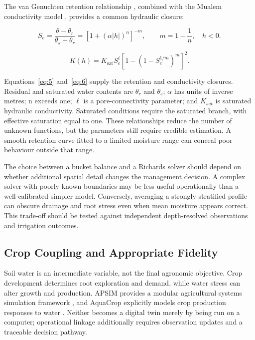 \documentclass[acmsmall,screen,nonacm]{acmart}
\begin{document}
The van Genuchten retention relationship \cite{R08}, combined with the Mualem conductivity model \cite{R09}, provides a common hydraulic closure:

\begin{equation}
S_e=\frac{\theta-\theta_r}{\theta_s-\theta_r}=\left[1+(\alpha|h|)^n\right]^{-m},\qquad m=1-\frac{1}{n},\quad h<0.
\label{eq:5}
\end{equation}

\begin{equation}
K(h)=K_{\mathrm{sat}}S_e^{\ell}\left[1-\left(1-S_e^{1/m}\right)^m\right]^2.
\label{eq:6}
\end{equation}

Equations~\eqref{eq:5} and~\eqref{eq:6} supply the retention and conductivity closures. Residual and saturated water contents are $\theta_{r}$ and $\theta_{s}$; $\alpha$ has units of inverse metres; n exceeds one; $\ell$ is a pore-connectivity parameter; and $K_{sat}$ is saturated hydraulic conductivity. Saturated conditions require the saturated branch, with effective saturation equal to one. These relationships reduce the number of unknown functions, but the parameters still require credible estimation. A smooth retention curve fitted to a limited moisture range can conceal poor behaviour outside that range.

The choice between a bucket balance and a Richards solver should depend on whether additional spatial detail changes the management decision. A complex solver with poorly known boundaries may be less useful operationally than a well-calibrated simpler model. Conversely, averaging a strongly stratified profile can obscure drainage and root stress even when mean moisture appears correct. This trade-off should be tested against independent depth-resolved observations and irrigation outcomes.

\subsection{Crop Coupling and Appropriate Fidelity}

\label{sec:4-3}

Soil water is an intermediate variable, not the final agronomic objective. Crop development determines root exploration and demand, while water stress can alter growth and production. APSIM provides a modular agricultural systems simulation framework \cite{R10}, and AquaCrop explicitly models crop production responses to water \cite{R11}. Neither becomes a digital twin merely by being run on a computer; operational linkage additionally requires observation updates and a traceable decision pathway.
\end{document}
